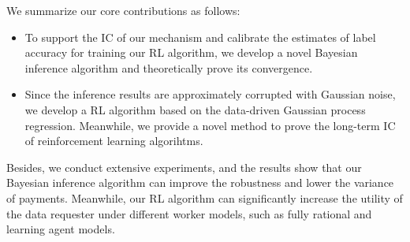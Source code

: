 


We summarize our core contributions as follows:
\begin{itemize}[topsep=0pt,  itemsep=0pt]
\item To support the IC of our mechanism and calibrate the estimates of label accuracy for training our RL algorithm, we develop a novel Bayesian inference algorithm and theoretically prove its convergence.
\item Since the inference results are approximately corrupted with Gaussian noise, we develop a RL algorithm based on the data-driven Gaussian process regression. Meanwhile, we provide a novel method to prove the long-term IC of reinforcement learning algorihtms.
\end{itemize}
Besides, we conduct extensive experiments, and the results show that our Bayesian inference algorithm can improve the robustness and lower the variance of payments. Meanwhile, our RL algorithm can significantly increase the utility of the data requester under different worker models, such as fully rational and learning agent models. 

